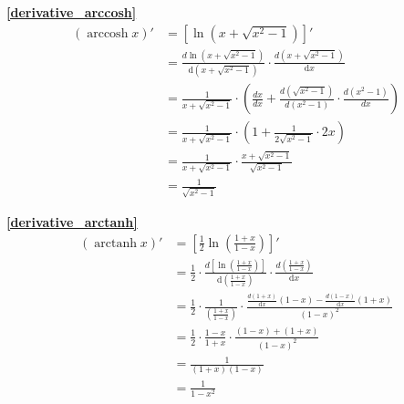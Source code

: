\textbf{\large \ref{derivative_arccosh}}
\begin{align*}
        (\operatorname{arccosh}{x})' &=\left[\ln(x+\sqrt{x^2-1})\right]'\\
                                    &=\frac{d \ln(x+\sqrt{x^2-1})}{\mathrm{d}{\left(x+\sqrt{x^2-1}\right)}}\cdot\frac{d \left(x+\sqrt{x^2-1}\right)}{\mathrm{d}{x}}\\
                                    &=\frac{1}{x+\sqrt{x^2-1}}\cdot\left(\frac{dx}{dx}+\frac{d \left(\sqrt{x^2-1}\right)}{d\left(x^2-1\right)}\cdot\frac{d(x^2-1)}{dx}\right)\\
                                    &=\frac{1}{x+\sqrt{x^2-1}}\cdot\left(1+\frac{1}{2\sqrt{x^2-1}}\cdot 2x\right)\\                                    
                                    &=\frac{1}{x+\sqrt{x^2-1}}\cdot\frac{x+\sqrt{x^2-1}}{\sqrt{x^2-1}}\\
                                    &=\frac{1}{\sqrt{x^2-1}}
\end{align*}

\textbf{\large \ref{derivative_arctanh}}
\begin{align*}
        (\operatorname{arctanh}{x})' &=\left[\frac{1}{2}\ln(\frac{1+x}{1-x})\right]'\\
        &=\frac{1}{2}\cdot\frac{d\left[\ln(\frac{1+x}{1-x})\right]}{\mathrm{d}{\left(\frac{1+x}{1-x}\right)}}\cdot\frac{d\left(\frac{1+x}{1-x}\right)}{\mathrm{d}{x}}\\
        &=\frac{1}{2}\cdot\frac{1}{\left(\frac{1+x}{1-x}\right)}\cdot\frac{\frac{d(1+x)}{\mathrm{d}{x}}(1-x)-\frac{d(1-x)}{\mathrm{d}{x}}(1+x)}{(1-x)^2}\\
        &=\frac{1}{2}\cdot\frac{1-x}{1+x}\cdot\frac{(1-x)+(1+x)}{(1-x)^2}\\
        &=\frac{1}{(1+x)(1-x)}\\
        &=\frac{1}{1-x^2}
\end{align*}

